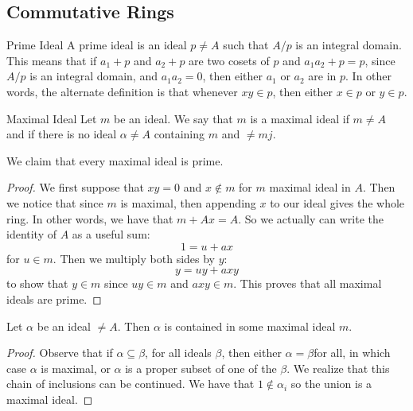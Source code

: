 \documentclass{report}
\begin{document}
\begin{topic}
    \section{Commutative Rings}
\end{topic}

\begin{definition}{Prime Ideal}
    A prime ideal is an ideal $p \neq A$ such that $A/p$ is an integral domain. This means that if $a_{1} + p$ and $a_{2} + p$ are two cosets of $p$ and $a_{1}a_{2} + p = p$, since $A/p$ is an integral domain, and $a_{1}a_{2} = 0$, then either $a_{1}$ or $a_{2}$ are in $p$. In other words, the alternate definition is that whenever $xy \in p$, then either $x \in p$ or $y \in p$.
\end{definition}

\begin{definition}{Maximal Ideal}
    Let $m$ be an ideal. We say that $m$ is a maximal ideal if $m \neq A$ and if there is no ideal $\alpha \neq A$ containing $m$ and $\neq mj$.
\end{definition}

We claim that every maximal ideal is prime.
    \begin{proof}
        We first suppose that $xy = 0$ and $x \notin m$ for $m$ maximal ideal in $A$. Then we notice that since $m$ is maximal, then appending $x$ to our ideal gives the whole ring. In other words, we have that $m + Ax = A$. So we actually can write the identity of $A$ as a useful sum:
            \begin{equation*}
                1 = u + ax
            \end{equation*}
        for $u \in m$. Then we multiply both sides by $y$:
            \begin{equation*}
                y = uy + axy
            \end{equation*}
        to show that $y \in m$ since $uy \in m$ and $axy \in m$. This proves that all maximal ideals are prime.
    \end{proof}

Let $\alpha$ be an ideal $\neq A$. Then $\alpha$ is contained in some maximal ideal $m$.
    \begin{proof}
        Observe that if $\alpha \subseteq \beta$, for all ideals $\beta$, then either $\alpha = \beta$for all, in which case $\alpha$ is maximal, or $\alpha$ is a proper subset of one of the $\beta$. We realize that this chain of inclusions can be continued. We have that $1 \notin \alpha_{i}$ so the union is a maximal ideal.
    \end{proof}
\end{document}
